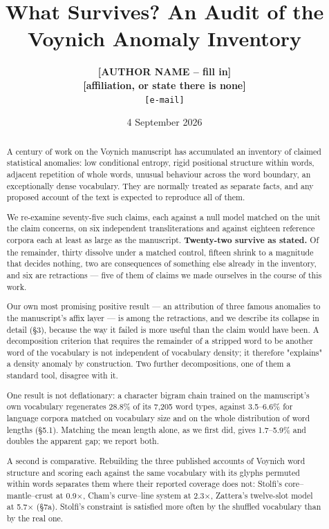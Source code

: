 \documentclass[11pt,a4paper]{article}
\title{What Survives? An Audit of the Voynich Anomaly Inventory}
\author{\textbf{[AUTHOR NAME -- fill in]}\\\textbf{[affiliation, or state there is none]}\\\texttt{[e-mail]}}
\date{4 September 2026}
\begin{document}
\maketitle

\begin{abstract}
A century of work on the Voynich manuscript has accumulated an inventory of claimed statistical anomalies: low conditional entropy, rigid positional structure within words, adjacent repetition of whole words, unusual behaviour across the word boundary, an exceptionally dense vocabulary. They are normally treated as separate facts, and any proposed account of the text is expected to reproduce all of them.


We re-examine seventy-five such claims, each against a null model matched on the unit the claim concerns, on six independent transliterations and against eighteen reference corpora each at least as large as the manuscript. \textbf{Twenty-two survive as stated.} Of the remainder, thirty dissolve under a matched control, fifteen shrink to a magnitude that decides nothing, two are consequences of something else already in the inventory, and six are retractions --- five of them of claims we made ourselves in the course of this work.


Our own most promising positive result --- an attribution of three famous anomalies to the manuscript's affix layer --- is among the retractions, and we describe its collapse in detail (\S3), because the way it failed is more useful than the claim would have been. A decomposition criterion that requires the remainder of a stripped word to be another word of the vocabulary is not independent of vocabulary density; it therefore "explains" a density anomaly by construction. Two further decompositions, one of them a standard tool, disagree with it.


One result is not deflationary: a character bigram chain trained on the manuscript's own vocabulary regenerates 28.8\% of its 7,205 word types, against 3.5--6.6\% for language corpora matched on vocabulary size and on the whole distribution of word lengths (\S5.1). Matching the mean length alone, as we first did, gives 1.7--5.9\% and doubles the apparent gap; we report both.


A second is comparative. Rebuilding the three published accounts of Voynich word structure and scoring each against the same vocabulary with its glyphs permuted within words separates them where their reported coverage does not: Stolfi's core--mantle--crust at 0.9$\times$, Cham's curve--line system at 2.3$\times$, Zattera's twelve-slot model at 5.7$\times$ (\S7a). Stolfi's constraint is satisfied more often by the shuffled vocabulary than by the real one.



\end{abstract}
\end{document}
